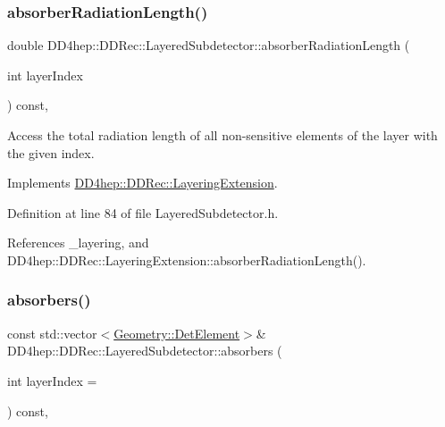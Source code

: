 \subsubsection{\texorpdfstring{absorber\+Radiation\+Length()}{absorberRadiationLength()}}
{\footnotesize\ttfamily double D\+D4hep\+::\+D\+D\+Rec\+::\+Layered\+Subdetector\+::absorber\+Radiation\+Length (\begin{DoxyParamCaption}\item[{int}]{layer\+Index }\end{DoxyParamCaption}) const\hspace{0.3cm}{\ttfamily [inline]}, {\ttfamily [virtual]}}



Access the total radiation length of all non-\/sensitive elements of the layer with the given index. 



Implements \hyperlink{class_d_d4hep_1_1_d_d_rec_1_1_layering_extension_aca33441136624022aa7414895ba81fef}{D\+D4hep\+::\+D\+D\+Rec\+::\+Layering\+Extension}.



Definition at line 84 of file Layered\+Subdetector.\+h.



References \+\_\+layering, and D\+D4hep\+::\+D\+D\+Rec\+::\+Layering\+Extension\+::absorber\+Radiation\+Length().

\hypertarget{class_d_d4hep_1_1_d_d_rec_1_1_layered_subdetector_a4862f154cb8951a588a0091cb76bd17e}{}\label{class_d_d4hep_1_1_d_d_rec_1_1_layered_subdetector_a4862f154cb8951a588a0091cb76bd17e} 
\subsubsection{\texorpdfstring{absorbers()}{absorbers()}}
{\footnotesize\ttfamily const std\+::vector$<$\hyperlink{class_d_d4hep_1_1_geometry_1_1_det_element}{Geometry\+::\+Det\+Element}$>$\& D\+D4hep\+::\+D\+D\+Rec\+::\+Layered\+Subdetector\+::absorbers (\begin{DoxyParamCaption}\item[{int}]{layer\+Index = {} }\end{DoxyParamCaption}) const\hspace{0.3cm}{\ttfamily [inline]}, {\ttfamily [virtual]}}



